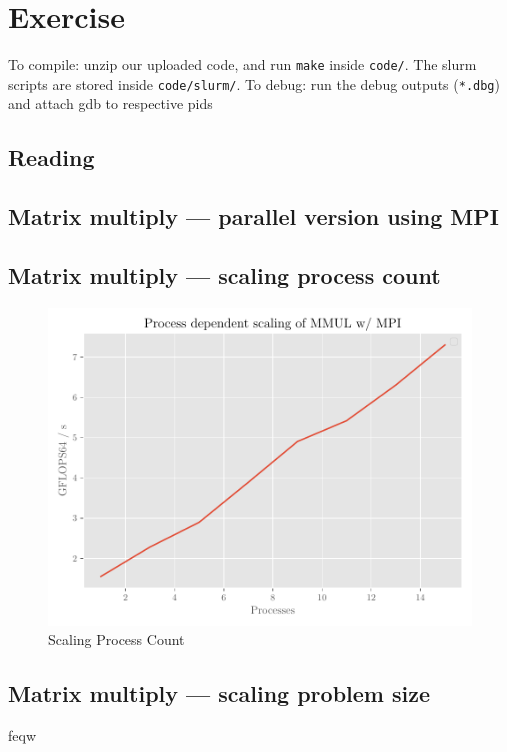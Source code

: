 \documentclass[]{scrartcl}
\newcommand{\exercise}{Exercise \thesection}
\begin{document}
\section*{\exercise}

To compile: unzip our uploaded code, and run \verb|make| inside \verb|code/|.
The slurm scripts are stored inside \verb|code/slurm/|.
To debug: run the debug outputs (\verb|*.dbg|) and attach gdb to respective pids

\subsection{Reading}
\subsection{Matrix multiply --- parallel version using MPI}
\subsection{Matrix multiply --- scaling process count}
\begin{table}[ht]
    \centering
    
\end{table}
\begin{figure}[ht]
    \centering
    \includegraphics[width=\linewidth]{img/scaling_proc.pdf}
    \caption{Scaling Process Count}%
    \label{fig:scaling_proc}
\end{figure}
\subsection{Matrix multiply --- scaling problem size}

feqw
\end{document}
